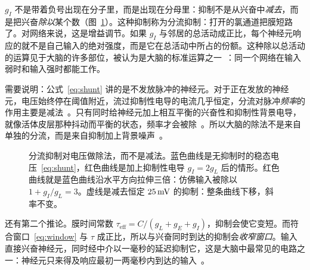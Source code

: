 $g_I$ 不是带着负号出现在分子里，而是出现在分母里：抑制不是从兴奋中\emph{减去}，而是把兴奋\emph{除以}某个数（图~\ref{fig:shunt}）。这种抑制称为分流抑制：打开的氯通道把膜短路了。对网络来说，这是增益调节。如果 $g_I$ 与邻居的总活动成正比，每个神经元响应的就不是自己输入的绝对强度，而是它在总活动中所占的份额。这种除以总活动的运算见于大脑的许多部位，被认为是大脑的标准运算之一~\cite{Carandini2012}：同一个网络在输入弱时和输入强时都能工作。

需要说明：公式~\eqref{eq:shunt} 讲的是不发放脉冲的神经元。对于正在发放的神经元，电压始终停在阈值附近，流过抑制性电导的电流几乎恒定，分流对脉冲\emph{频率}的作用主要是减法~\cite{HoltKoch1997}。只有同时给神经元加上相互平衡的兴奋性和抑制性背景电导，就像活体皮层那种抖动而平衡的状态，频率才会被除~\cite{Chance2002}。所以大脑的除法不是来自单独的分流，而是来自抑制加上背景噪声~\cite{Carandini2012}。

\begin{figure}[t]
\centering
{}
\caption{分流抑制对电压做除法，而不是减法。蓝色曲线是无抑制时的稳态电压~\eqref{eq:shunt}，红色曲线是加上抑制性电导 $g_I=2g_L$ 后的情形。红色曲线就是蓝色曲线沿水平方向拉伸三倍：仿佛输入被除以 $1+g_I/g_L=3$。虚线是减去恒定 $25\,\text{mV}$ 的抑制：整条曲线下移，斜率不变。}
\label{fig:shunt}
\end{figure}

还有第二个推论。膜时间常数 $\tau_{\text{eff}}=C/(g_L+g_E+g_I)$，抑制会使它变短。而符合窗口~\eqref{eq:window} 与 $\tau$ 成正比，所以与兴奋同时到达的抑制会\emph{收窄窗口}。输入直接兴奋神经元，同时经中介以一毫秒的延迟抑制它，这是大脑中最常见的电路之一：神经元只来得及响应最初一两毫秒内到达的输入~\cite{Pouille2001}。

